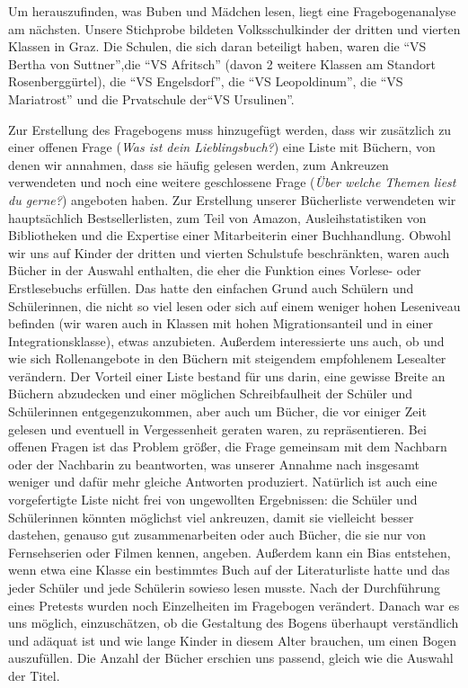 Um herauszufinden, was Buben und Mädchen lesen, liegt eine
Fragebogenanalyse am nächsten. Unsere Stichprobe bildeten
Volksschulkinder der dritten und vierten Klassen in Graz. Die Schulen,
die sich daran beteiligt haben, waren die ``VS Bertha von Suttner'',die
``VS Afritsch'' (davon 2 weitere Klassen am Standort Rosenberggürtel),
die ``VS Engelsdorf'', die ``VS Leopoldinum'', die ``VS Mariatrost'' und
die Prvatschule der``VS Ursulinen''.

Zur Erstellung des Fragebogens muss hinzugefügt werden, dass wir
zusätzlich zu einer offenen Frage (\emph{Was ist dein Lieblingsbuch?})
eine Liste mit Büchern, von denen wir annahmen, dass sie häufig gelesen
werden, zum Ankreuzen verwendeten und noch eine weitere geschlossene
Frage (\emph{Über welche Themen liest du gerne?}) angeboten haben. Zur
Erstellung unserer Bücherliste verwendeten wir hauptsächlich
Bestsellerlisten, zum Teil von Amazon, Ausleihstatistiken von
Bibliotheken und die Expertise einer Mitarbeiterin einer Buchhandlung.
Obwohl wir uns auf Kinder der dritten und vierten Schulstufe
beschränkten, waren auch Bücher in der Auswahl enthalten, die eher die
Funktion eines Vorlese- oder Erstlesebuchs erfüllen. Das hatte den
einfachen Grund auch Schülern und Schülerinnen, die nicht so viel lesen
oder sich auf einem weniger hohen Leseniveau befinden (wir waren auch in
Klassen mit hohen Migrationsanteil und in einer Integrationsklasse),
etwas anzubieten. Außerdem interessierte uns auch, ob und wie sich
Rollenangebote in den Büchern mit steigendem empfohlenem Lesealter
verändern. Der Vorteil einer Liste bestand für uns darin, eine gewisse
Breite an Büchern abzudecken und einer möglichen Schreibfaulheit der
Schüler und Schülerinnen entgegenzukommen, aber auch um Bücher, die vor
einiger Zeit gelesen und eventuell in Vergessenheit geraten waren, zu
repräsentieren. Bei offenen Fragen ist das Problem größer, die Frage
gemeinsam mit dem Nachbarn oder der Nachbarin zu beantworten, was
unserer Annahme nach insgesamt weniger und dafür mehr gleiche Antworten
produziert. Natürlich ist auch eine vorgefertigte Liste nicht frei von
ungewollten Ergebnissen: die Schüler und Schülerinnen könnten möglichst
viel ankreuzen, damit sie vielleicht besser dastehen, genauso gut
zusammenarbeiten oder auch Bücher, die sie nur von Fernsehserien oder
Filmen kennen, angeben. Außerdem kann ein Bias entstehen, wenn etwa eine
Klasse ein bestimmtes Buch auf der Literaturliste hatte und das jeder
Schüler und jede Schülerin sowieso lesen musste. Nach der Durchführung
eines Pretests wurden noch Einzelheiten im Fragebogen verändert. Danach
war es uns möglich, einzuschätzen, ob die Gestaltung des Bogens
überhaupt verständlich und adäquat ist und wie lange Kinder in diesem
Alter brauchen, um einen Bogen auszufüllen. Die Anzahl der Bücher
erschien uns passend, gleich wie die Auswahl der Titel.

